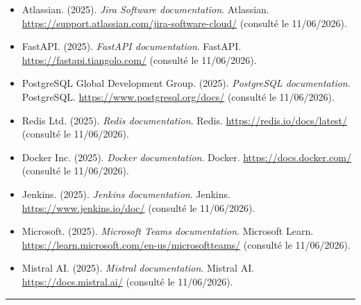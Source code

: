 \sloppy
\begin{itemize}
    \renewcommand{\labelitemi}{—}
    \item Atlassian. (2025). \textit{Jira Software documentation}. Atlassian. \url{https://support.atlassian.com/jira-software-cloud/} (consulté le 11/06/2026).
    \item FastAPI. (2025). \textit{FastAPI documentation}. FastAPI. \url{https://fastapi.tiangolo.com/} (consulté le 11/06/2026).
    \item PostgreSQL Global Development Group. (2025). \textit{PostgreSQL documentation}. PostgreSQL. \url{https://www.postgresql.org/docs/} (consulté le 11/06/2026).
    \item Redis Ltd. (2025). \textit{Redis documentation}. Redis. \url{https://redis.io/docs/latest/} (consulté le 11/06/2026).
    \item Docker Inc. (2025). \textit{Docker documentation}. Docker. \url{https://docs.docker.com/} (consulté le 11/06/2026).
    \item Jenkins. (2025). \textit{Jenkins documentation}. Jenkins. \url{https://www.jenkins.io/doc/} (consulté le 11/06/2026).
    \item Microsoft. (2025). \textit{Microsoft Teams documentation}. Microsoft Learn. \url{https://learn.microsoft.com/en-us/microsoftteams/} (consulté le 11/06/2026).
    \item Mistral AI. (2025). \textit{Mistral documentation}. Mistral AI. \url{https://docs.mistral.ai/} (consulté le 11/06/2026).
\end{itemize}
\fussy

\vspace{0.5em}
\noindent\rule{\linewidth}{0.4pt}